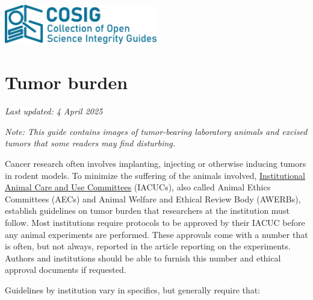 \documentclass[letterpaper, 12pt]{article}
\begin{document}
\flushleft
\includegraphics[width=0.5\textwidth]{img/home/241017_final_logo_mockup.png}

\section*{Tumor burden}
\textit{Last updated: 4 April 2025}

\textit{Note: This guide contains images of tumor-bearing laboratory animals and excised tumors that some readers may find disturbing.}

Cancer research often involves implanting, injecting or otherwise inducing tumors in rodent models. To minimize the suffering of the animals involved, \href{https://en.wikipedia.org/wiki/Institutional_Animal_Care_and_Use_Committee}{Institutional Animal Care and Use Committees} (IACUCs), also called Animal Ethics Committees (AECs) and Animal Welfare and Ethical Review Body (AWERBs), establish guidelines on tumor burden that researchers at the institution must follow. Most institutions require protocols to be approved by their IACUC before any animal experiments are performed. These approvals come with a number that is often, but not always, reported in the article reporting on the experiments. Authors and institutions should be able to furnish this number and ethical approval documents if requested.

Guidelines by institution vary in specifics, but generally require that:
\end{document}
